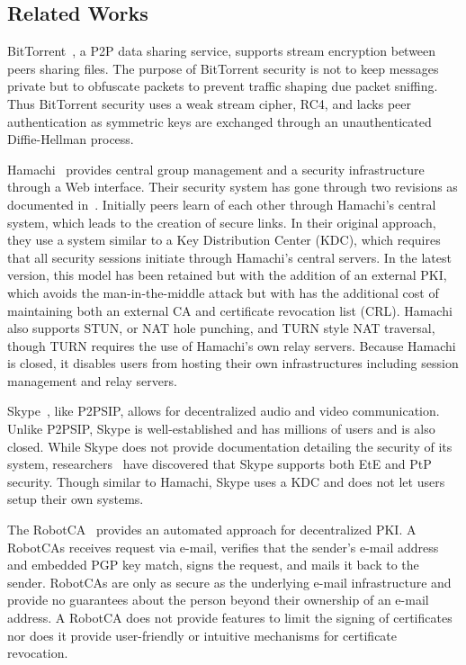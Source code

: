 \documentclass[conference]{IEEEtran}
\begin{document}
\subsection{Related Works}
BitTorrent~\cite{bittorrent_security}, a P2P data sharing service,  supports
stream encryption between peers sharing files.  The purpose of BitTorrent
security is not to keep messages private but to obfuscate packets to
prevent traffic shaping due packet sniffing. Thus BitTorrent security uses a
weak stream cipher, RC4, and lacks peer authentication as symmetric keys are
exchanged through an unauthenticated Diffie-Hellman process.

Hamachi~\cite{hamachi} provides central group management and a security
infrastructure through a Web interface.  Their security system has gone through
two revisions as documented in~\cite{hamachi_security}.  Initially peers learn
of each other through Hamachi's central system, which leads to the creation of
secure links.  In their original approach, they use a system similar to a Key
Distribution Center (KDC), which requires that all security sessions initiate
through Hamachi's central servers.  In the latest version, this model has been
retained but with the addition of an external PKI, which avoids the
man-in-the-middle attack but with has the additional cost of maintaining both
an external CA and certificate revocation list (CRL).  Hamachi also supports
STUN, or NAT hole punching, and TURN style NAT traversal, though TURN requires the use of
Hamachi's own relay servers.  Because Hamachi is closed, it disables users from
hosting their own infrastructures including session management and relay
servers.

Skype~\cite{skype}, like P2PSIP, allows for decentralized audio and video
communication. Unlike P2PSIP, Skype is well-established and has millions
of users and is also closed.  While Skype does not provide documentation
detailing the security of its system, researchers~\cite{skype_auth,
skype_overview} have discovered that Skype supports both EtE and PtP security.
Though similar to Hamachi, Skype uses a KDC and does not let users setup their
own systems.

The RobotCA~\cite{robotca} provides an automated approach for decentralized
PKI.  A RobotCAs receives request via e-mail, verifies that the sender's e-mail
address and embedded PGP key match, signs the request, and mails it back to the
sender.  RobotCAs are only as secure as the underlying e-mail infrastructure
and provide no guarantees about the person beyond their ownership of an e-mail
address.  A RobotCA does not provide features to limit the signing of
certificates nor does it provide user-friendly or intuitive mechanisms for
certificate revocation.
\end{document}
